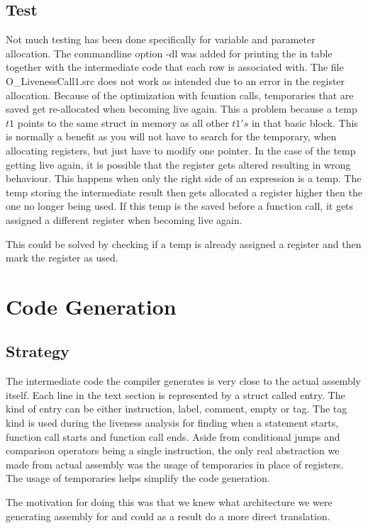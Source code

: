 \documentclass{article}
\begin{document}
\subsection{Test}
Not much testing has been done specifically for variable and parameter allocation. The commandline option -dl was added for printing the in table together with the intermediate code that each row is associated with. The file O\_LivenessCall1.src does not work as intended due to an error in the register allocation. Because of the optimization with fcuntion calls, temporaries that are saved get re-allocated when becoming live again. This a problem because a temp $t1$ points to the same struct in memory as all other $t1's$ in that basic block. This is normally a benefit as you will not have to search for the temporary, when allocating registers, but just have to modify one pointer. In the case of the temp getting live again, it is possible that the register gets altered resulting in wrong behaviour. This happens when only the right side of an expression is a temp. The temp storing the intermediate result then gets allocated a register higher then the one no longer being used. If this temp is the saved before a function call, it gets assigned a different register when becoming live again. 

This could be solved by checking if a temp is already assigned a register and then mark the register as used.

\section{Code Generation}
\subsection{Strategy}
The intermediate code the compiler generates is very close to the actual assembly itself. Each line in the text section is represented by a struct called entry. The kind of entry can be either instruction, label, comment, empty or tag. The tag kind is used during the liveness analysis for finding when a statement starts, function call starts and function call ends. Aside from conditional jumps and comparison operators being a single instruction, the only real abstraction we made from actual assembly was the usage of temporaries in place of registers. The usage of temporaries helps simplify the code generation.

The motivation for doing this was that we knew what architecture we were generating assembly for and could as a result do a more direct translation. 
\end{document}
